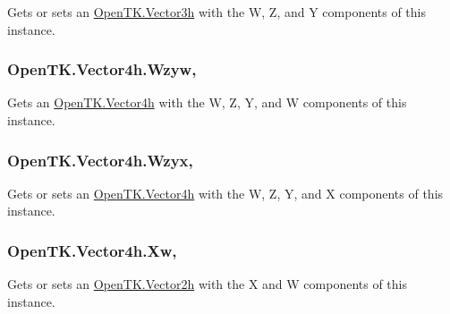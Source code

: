 Gets or sets an \hyperlink{struct_open_t_k_1_1_vector3h}{Open\-T\-K.\-Vector3h} with the W, Z, and Y components of this instance. 

\hypertarget{struct_open_t_k_1_1_vector4h_ae637bf66627c2d29eb099846a597e9a3}{
\subsubsection[{Wzyw}]{ Open\-T\-K.\-Vector4h.\-Wzyw\hspace{0.3cm}{\ttfamily [get]}, {\ttfamily [set]}}}\label{struct_open_t_k_1_1_vector4h_ae637bf66627c2d29eb099846a597e9a3}


Gets an \hyperlink{struct_open_t_k_1_1_vector4h}{Open\-T\-K.\-Vector4h} with the W, Z, Y, and W components of this instance. 

\hypertarget{struct_open_t_k_1_1_vector4h_af530b17e506fad0d870501eab6da283e}{
\subsubsection[{Wzyx}]{ Open\-T\-K.\-Vector4h.\-Wzyx\hspace{0.3cm}{\ttfamily [get]}, {\ttfamily [set]}}}\label{struct_open_t_k_1_1_vector4h_af530b17e506fad0d870501eab6da283e}


Gets or sets an \hyperlink{struct_open_t_k_1_1_vector4h}{Open\-T\-K.\-Vector4h} with the W, Z, Y, and X components of this instance. 

\hypertarget{struct_open_t_k_1_1_vector4h_a1fbc241901d7335f761da708abc92cd2}{
\subsubsection[{Xw}]{ Open\-T\-K.\-Vector4h.\-Xw\hspace{0.3cm}{\ttfamily [get]}, {\ttfamily [set]}}}\label{struct_open_t_k_1_1_vector4h_a1fbc241901d7335f761da708abc92cd2}


Gets or sets an \hyperlink{struct_open_t_k_1_1_vector2h}{Open\-T\-K.\-Vector2h} with the X and W components of this instance. 

